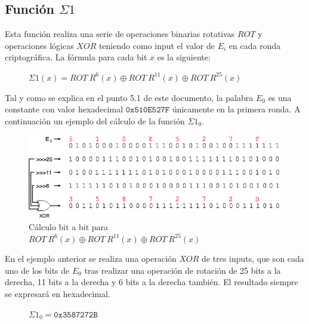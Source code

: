 \documentclass{article}
\begin{document}
    \subsection{Función $\Sigma1$}
        Esta función realiza una serie de operaciones binarias rotativas $ROT$ y operaciones lógicas $XOR$ teniendo como input el valor de $E_{i}$ en cada ronda criptográfica. La fórmula para cada bit $x$ es la siguiente:
            \begin{figure}[H]
            \centering
                $\Sigma1(x) = ROT \ R^{6}(x) \oplus ROT \ R^{11}(x) \oplus ROT \ R^{25}(x)$
            \end{figure}
        Tal y como se explica en el punto 5.1 de este documento, la palabra $E_{0}$ es una constante con valor hexadecimal $\texttt{0x510E527F}$ únicamente en la primera ronda. A continuación un ejemplo del cálculo de la función $\Sigma1_{0}$.
            \begin{figure}[H]
            \centering
                \includegraphics[scale=0.41]{img/SHA-256-function_Sigma1.png}
                \caption{Cálculo bit a bit para $ROT \ R^{6}(x) \oplus ROT \ R^{11}(x) \oplus ROT \ R^{25}(x)$}
            \end{figure}
        En el ejemplo anterior se realiza una operación $XOR$ de tres inputs, que son cada uno de los bits de $E_{0}$ tras realizar una operación de rotación de 25 bits a la derecha, 11 bits a la derecha y 6 bits a la derecha también. El resultado siempre se expresará en hexadecimal.
            \begin{figure}[H]
            \centering
                $\Sigma1_{0} = \texttt{0x3587272B}$
            \end{figure}
        
\end{document}
